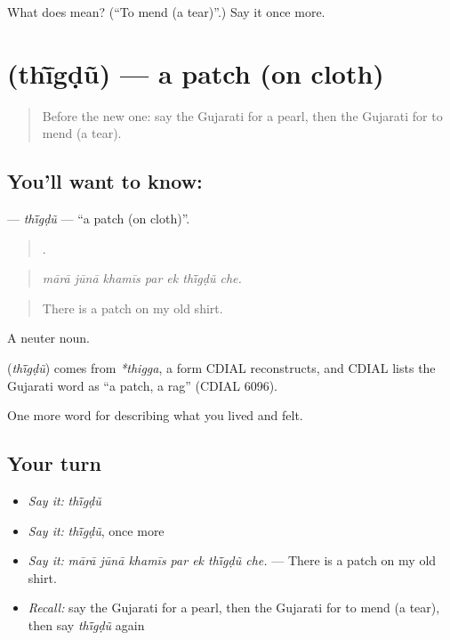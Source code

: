 \begin{tcolorbox}[breakable,colback=teal!4,colframe=teal!35!black,title={Before you move on}]
What does  mean? (\textquotedblleft{}To mend (a tear)\textquotedblright{}.) Say it once more.
\end{tcolorbox}
\section[\texorpdfstring{\gu{થીંગડું} (thī̃gḍũ)}{થીંગડું (thī̃gḍũ)}]{ (thī̃gḍũ) — a patch (on cloth)}

\label{lesson:GU-C507-thigdu}



\begin{quote}
Before the new one: say the Gujarati for a pearl, then the Gujarati for to mend (a tear).
\end{quote}

\subsection*{You'll want to know: }
\textbf{} — \emph{thī̃gḍũ} — \textquotedblleft{}a patch (on cloth)\textquotedblright{}.

\begin{quote}
      .
\end{quote}

\begin{quote}
\emph{mārā jūnā khamīs par ek thī̃gḍũ che.}
\end{quote}

\begin{quote}
There is a patch on my old shirt.
\end{quote}

A neuter noun.

\begin{cousinweb}
\textbf{} (\emph{thī̃gḍũ}) comes from \emph{*thigga}, a form CDIAL reconstructs, and CDIAL lists the Gujarati word as \textquotedblleft{}a patch, a rag\textquotedblright{} (CDIAL 6096).
\end{cousinweb}

\begin{grammarlens}[title={What you've built}]
One more word for describing what you lived and felt.
\end{grammarlens}

\subsection*{Your turn}
\begin{itemize}
\raggedright
  \item \emph{Say it:} \emph{thī̃gḍũ}
  \item \emph{Say it:} \emph{thī̃gḍũ}, once more
  \item \emph{Say it:} \emph{mārā jūnā khamīs par ek thī̃gḍũ che.} — There is a patch on my old shirt.
  \item \emph{Recall:} say the Gujarati for a pearl, then the Gujarati for to mend (a tear), then say \emph{thī̃gḍũ} again
\end{itemize}

